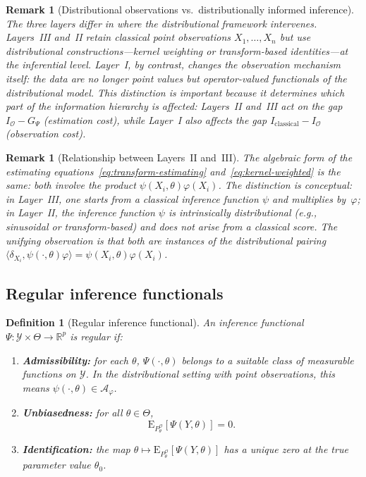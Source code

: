 \documentclass[11pt,a4paper]{article}
\newtheorem{definition}[theorem]{Definition}
\newtheorem{remark}[theorem]{Remark}
\newcommand{\E}{\mathrm{E}}
\newcommand{\R}{\mathbb{R}}
\newcommand{\eg}{{e.g.}, }
\begin{document}
\begin{remark}[Distributional observations vs.\ distributionally informed inference]\label{rem:obs-vs-inf}
The three layers differ in \emph{where} the distributional framework
intervenes.  Layers~III and~II retain classical point observations
$X_1, \ldots, X_n$ but use distributional constructions---kernel weighting
or transform-based identities---at the inferential level.  Layer~I, by
contrast, changes the observation mechanism itself: the data are no longer
point values but operator-valued functionals of the distributional model.
This distinction is important because it determines which part of the
information hierarchy is affected: Layers~II and~III act on the gap
$I_{\mathcal O} - G_\Psi$ (estimation cost), while Layer~I also affects
the gap $I_{\mathrm{classical}} - I_{\mathcal O}$ (observation cost).
\end{remark}

\begin{remark}[Relationship between Layers~II and~III]\label{rem:layers-II-III}
The algebraic form of the estimating
equations~\eqref{eq:transform-estimating} and~\eqref{eq:kernel-weighted} is
the same: both involve the product $\psi(X_i, \theta)\varphi(X_i)$.  The
distinction is conceptual: in Layer~III, one starts from a classical
inference function $\psi$ and multiplies by~$\varphi$; in Layer~II, the
inference function $\psi$ is intrinsically distributional (\eg sinusoidal
or transform-based) and does not arise from a classical score.  The
unifying observation is that both are instances of the distributional
pairing
$\langle \delta_{X_i}, \psi(\cdot, \theta)\varphi \rangle
= \psi(X_i, \theta)\varphi(X_i)$.
\end{remark}

\subsection{Regular inference functionals}\label{subsec:regular-if}

\begin{definition}[Regular inference functional]\label{def:rif}
An inference functional $\Psi : \mathcal Y \times \Theta \to \R^p$ is
\emph{regular} if:
\begin{enumerate}
\item[(R1)] \textbf{Admissibility:} for each $\theta$, $\Psi(\cdot, \theta)$
belongs to a suitable class of measurable functions on $\mathcal Y$.  In the
distributional setting with point observations, this means
$\psi(\cdot, \theta) \in \mathcal A_\varphi$.

\item[(R2)] \textbf{Unbiasedness:} for all $\theta \in \Theta$,
\[
\E_{P_\theta^{\mathcal O}}[\Psi(Y, \theta)] = 0.
\]

\item[(R3)] \textbf{Identification:} the map
$\theta \mapsto \E_{P_\theta^{\mathcal O}}[\Psi(Y, \theta)]$ has a unique
zero at the true parameter value $\theta_0$.
\end{enumerate}
\end{definition}
\end{document}
